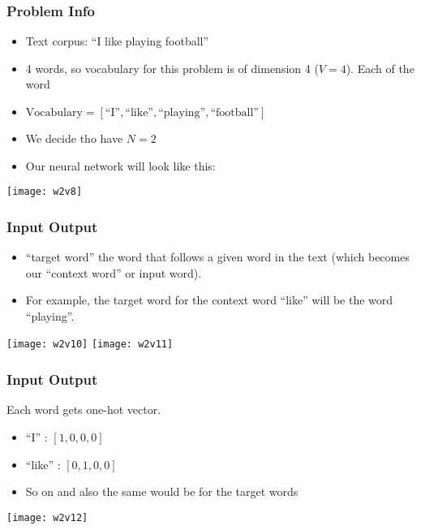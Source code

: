 \begin{frame}[fragile]\frametitle{Problem Info}
  \begin{itemize}
    \item Text corpus: ``I like playing football''
	\item 4 words, so vocabulary for this problem is of dimension 4 ($V=4$). Each of the word
	\item $\textrm{Vocabulary}=[\textrm{“I”},  \textrm{“like”}, \textrm{“playing”}, \textrm{“football”}]$
	\item We decide tho have $N=2$
	\item Our neural network will look like this:
  \end{itemize}
  
\begin{center}
\texttt{[image: w2v8]}
\end{center}  
  
\end{frame}

\begin{frame}[fragile]\frametitle{Input Output}
  \begin{itemize}
    \item  ``target word'' the word that follows a given word in the text (which becomes our ``context word'' or input word).
	\item For example, the target word for the context word “like” will be the word “playing”. 
  \end{itemize}
  
\begin{center}
\texttt{[image: w2v10]}
\texttt{[image: w2v11]}
\end{center}  
  
\end{frame}

\begin{frame}[fragile]\frametitle{Input Output}
Each word gets one-hot vector.
  \begin{itemize}
    \item “I” : $[1, 0, 0, 0]$
	\item “like” : $[0, 1, 0, 0]$
	\item So on and also the same would be for the target words
  \end{itemize}
  
\begin{center}
\texttt{[image: w2v12]}
\end{center}    

  
\end{frame}

